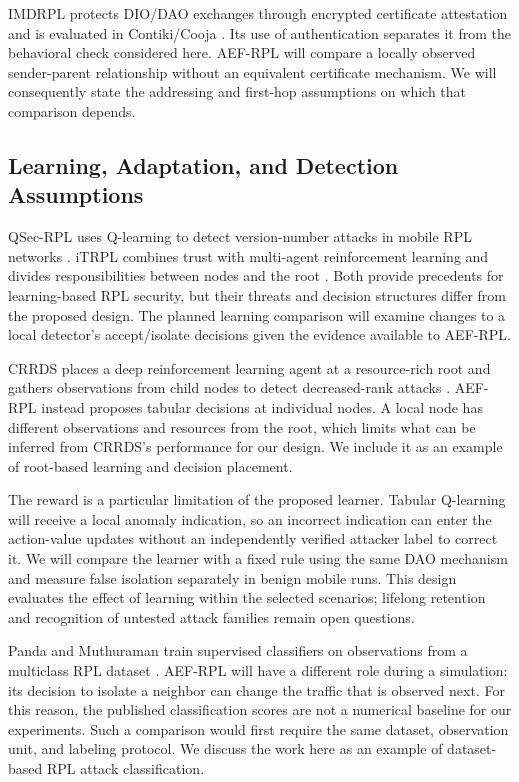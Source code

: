 \documentclass[journal]{IEEEtran}
\begin{document}
IMDRPL protects DIO/DAO exchanges through encrypted certificate attestation and is evaluated in Contiki/Cooja \cite{imdrpl2023}. Its use of authentication separates it from the behavioral check considered here. AEF-RPL will compare a locally observed sender-parent relationship without an equivalent certificate mechanism. We will consequently state the addressing and first-hop assumptions on which that comparison depends.

\subsection{Learning, Adaptation, and Detection Assumptions}
QSec-RPL uses Q-learning to detect version-number attacks in mobile RPL networks \cite{qsecrpl2023}. iTRPL combines trust with multi-agent reinforcement learning and divides responsibilities between nodes and the root \cite{itrpl2024}. Both provide precedents for learning-based RPL security, but their threats and decision structures differ from the proposed design. The planned learning comparison will examine changes to a local detector's accept/isolate decisions given the evidence available to AEF-RPL.

CRRDS places a deep reinforcement learning agent at a resource-rich root and gathers observations from child nodes to detect decreased-rank attacks \cite{haqdad2026}. AEF-RPL instead proposes tabular decisions at individual nodes. A local node has different observations and resources from the root, which limits what can be inferred from CRRDS's performance for our design. We include it as an example of root-based learning and decision placement.

The reward is a particular limitation of the proposed learner. Tabular Q-learning \cite{watkins1992} will receive a local anomaly indication, so an incorrect indication can enter the action-value updates without an independently verified attacker label to correct it. We will compare the learner with a fixed rule using the same DAO mechanism and measure false isolation separately in benign mobile runs. This design evaluates the effect of learning within the selected scenarios; lifelong retention and recognition of untested attack families remain open questions.

Panda and Muthuraman train supervised classifiers on observations from a multiclass RPL dataset \cite{panda2026}. AEF-RPL will have a different role during a simulation: its decision to isolate a neighbor can change the traffic that is observed next. For this reason, the published classification scores are not a numerical baseline for our experiments. Such a comparison would first require the same dataset, observation unit, and labeling protocol. We discuss the work here as an example of dataset-based RPL attack classification.
\end{document}
